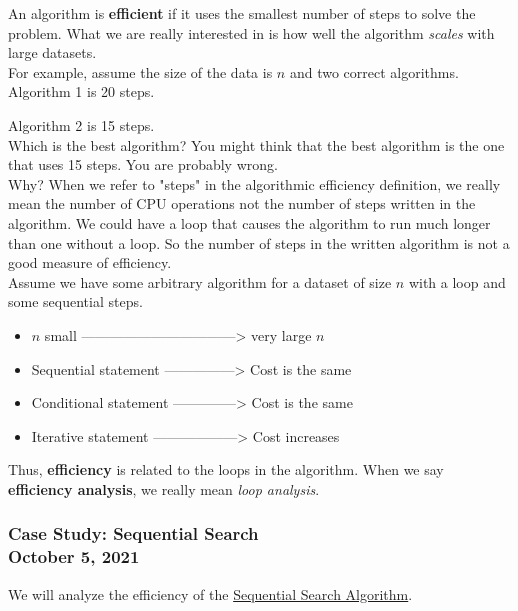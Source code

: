 \documentclass[]{article}
\begin{document}
An algorithm is \textbf{efficient} if it uses the smallest number of steps to solve the problem. What we are really interested in is how well the algorithm \textit{scales} with large datasets. \\

For example, assume the size of the data is $n$ and two correct algorithms. \\ 

Algorithm 1 is 20 steps. \par 
Algorithm 2 is 15 steps. \\

Which is the best algorithm? You might think that the best algorithm is the one that uses 15 steps. You are probably wrong.\\

Why? When we refer to "steps" in the algorithmic efficiency definition, we really mean the number of CPU operations not the number of steps written in the algorithm. We could have a loop that causes the algorithm to run much longer than one without a loop. So the number of steps in the written algorithm is not a good measure of efficiency.\\

Assume we have some arbitrary algorithm for a dataset of size $n$ with a loop and some sequential steps. 

\begin{itemize}
	\item $n$ small ---------------------------------> very large $n$
	\item Sequential statement ---------------> Cost is the same
	\item Conditional statement --------------> Cost is the same
	\item Iterative statement ------------------> Cost increases
\end{itemize}

Thus, \textbf{efficiency} is related to the loops in the algorithm. When we say \textbf{efficiency analysis}, we really mean \textit{loop analysis}.


\subsubsection{Case Study: Sequential Search\\ {\normalfont October 5, 2021}}
\bigbreak

We will analyze the efficiency of the \hyperref[sequentialsearchalgorithm]{Sequential Search Algorithm}. \\
\end{document}
